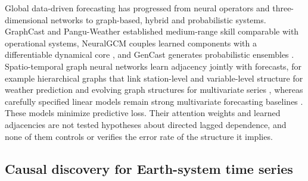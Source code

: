 \documentclass[preprint,12pt]{elsarticle}
\begin{document}
Global data-driven forecasting has progressed from neural operators and three-dimensional networks to graph-based, hybrid and probabilistic systems. GraphCast \citep{Lam2023GraphCast} and Pangu-Weather \citep{Bi2023Pangu} established medium-range skill comparable with operational systems, NeuralGCM couples learned components with a differentiable dynamical core \citep{Kochkov2024NeuralGCM}, and GenCast generates probabilistic ensembles \citep{Price2025GenCast}. Spatio-temporal graph neural networks learn adjacency jointly with forecasts, for example hierarchical graphs that link station-level and variable-level structure for weather prediction \citep{Ma2023HiSTGNN} and evolving graph structures for multivariate series \citep{Ye2025EvolvingGraph}, whereas carefully specified linear models remain strong multivariate forecasting baselines \citep{Zeng2023DLinear}. These models minimize predictive loss. Their attention weights and learned adjacencies are not tested hypotheses about directed lagged dependence, and none of them controls or verifies the error rate of the structure it implies.

\subsection{Causal discovery for Earth-system time series}
\end{document}
